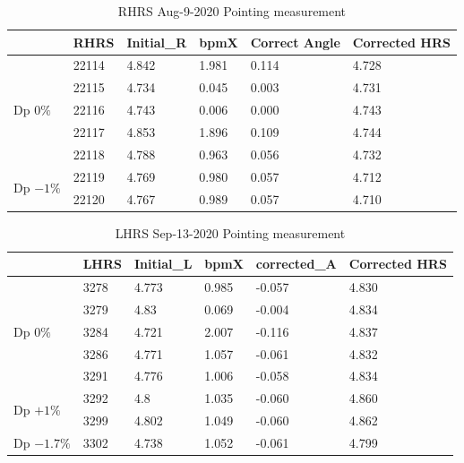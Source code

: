 \begin{table}[!ht]
    \caption{RHRS Aug-9-2020 Pointing measurement}
    \centering
    \begin{tabular}{|l|l|l|l|l|l|}
    \hline
        ~ & RHRS & Initial\_R & bpmX & Correct Angle & Corrected HRS \\ \hline
        \multirow{5}{5em}{Dp $0\%$} & 22114 & 4.842 & 1.981 & 0.114 & 4.728 \\ 
        ~ & 22115 & 4.734 & 0.045 & 0.003 & 4.731 \\  
        ~ & 22116 & 4.743 & 0.006 & 0.000 & 4.743 \\  
        ~ & 22117 & 4.853 & 1.896 & 0.109 & 4.744 \\  
        ~ & 22118 & 4.788 & 0.963 & 0.056 & 4.732 \\ \hline
        \multirow{2}{5em}{Dp $-1\%$} & 22119 & 4.769 & 0.980 & 0.057 & 4.712 \\ 
        ~ & 22120 & 4.767 & 0.989 & 0.057 & 4.710 \\ \hline
    \end{tabular}
    \label{table:crex_2_pointing_rhrs}
\end{table}

\begin{table}[!ht]
    \caption{LHRS Sep-13-2020 Pointing measurement}
    \centering
    \begin{tabular}{|l|l|l|l|l|l|}
    \hline
        ~ & LHRS & Initial\_L & bpmX & corrected\_A & Corrected HRS \\ \hline
        \multirow{5}{5em}{Dp $0\%$} & 3278 & 4.773 & 0.985 & -0.057 & 4.830 \\  
        ~ & 3279 & 4.83 & 0.069 & -0.004 & 4.834 \\  
        ~ & 3284 & 4.721 & 2.007 & -0.116 & 4.837 \\  
        ~ & 3286 & 4.771 & 1.057 & -0.061 & 4.832 \\ 
        ~ & 3291 & 4.776 & 1.006 & -0.058 & 4.834 \\ \hline
        \multirow{2}{5em}{Dp $+1\%$}  & 3292 & 4.8 & 1.035 & -0.060 & 4.860 \\  
        ~ & 3299 & 4.802 & 1.049 & -0.060 & 4.862 \\ \hline
        \multirow{1}{5em}{Dp $-1.7\%$} & 3302 & 4.738 & 1.052 & -0.061 & 4.799 \\ \hline
    \end{tabular}
    \label{table:crex_3_pointing_lhrs}
\end{table}


